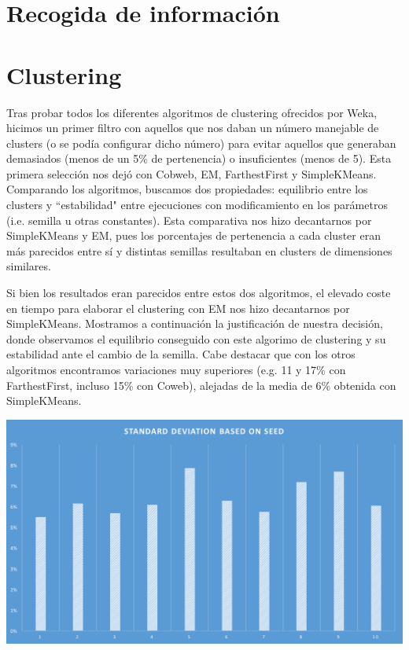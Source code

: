 \documentclass[12pt]{article}
\begin{document}
\newpage
\section{Recogida de información}



\section{Clustering}


Tras probar todos los diferentes algoritmos de clustering ofrecidos por Weka, hicimos un primer filtro con aquellos que nos daban un número manejable de clusters (o se podía configurar dicho número) para evitar aquellos que generaban demasiados (menos de un 5\% de pertenencia) o insuficientes (menos de 5). Esta primera selección nos dejó con Cobweb, EM, FarthestFirst y SimpleKMeans. Comparando los algoritmos, buscamos dos propiedades: equilibrio entre los clusters y ``estabilidad" entre ejecuciones con modificamiento en los parámetros (i.e. semilla u otras constantes). Esta comparativa nos hizo decantarnos por SimpleKMeans y EM, pues los porcentajes de pertenencia a cada cluster eran más parecidos entre sí y distintas semillas resultaban en clusters de dimensiones similares.

Si bien los resultados eran parecidos entre estos dos algoritmos, el elevado coste en tiempo para elaborar el clustering con EM nos hizo decantarnos por SimpleKMeans. Mostramos a continuación la justificación de nuestra decisión, donde observamos el equilibrio conseguido con este algorimo de clustering y su estabilidad ante el cambio de la semilla. Cabe destacar que con los otros algoritmos encontramos variaciones muy superiores (e.g. 11 y 17\% con FarthestFirst, incluso 15\% con Coweb), alejadas de la media de 6\% obtenida con SimpleKMeans.

\begin{center}
    \includegraphics[width=15cm]{stdff}
\end{center}
\end{document}
